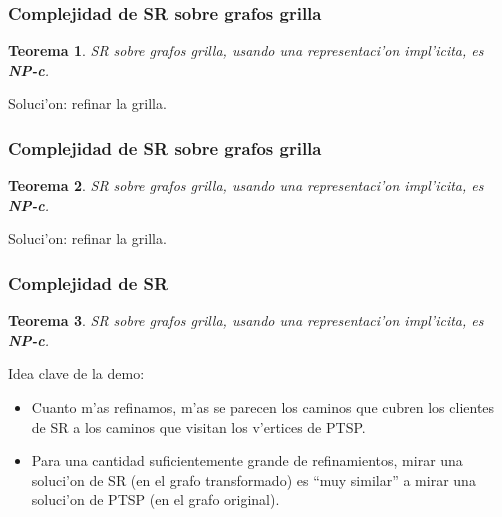 \documentclass{beamer}
\newcommand{\class}[1]{\textnormal{\textbf{#1}}}
\newcommand{\probl}[1]{\textnormal{\textsf{#1}}}
\newtheorem*{thm}{Teorema}
\begin{document}
\begin{frame}
\frametitle{Complejidad de \probl{SR} sobre grafos grilla}

\begin{thm}
\probl{SR} sobre grafos grilla, usando una representaci'on impl'icita, es \class{NP-c}.
\end{thm}

Soluci'on: refinar la grilla.

\vspace{3mm}

\begin{figure}
	\begin{center}
		
	\end{center}	
\end{figure}

\end{frame}

\begin{frame}
\frametitle{Complejidad de \probl{SR} sobre grafos grilla}

\begin{thm}
\probl{SR} sobre grafos grilla, usando una representaci'on impl'icita, es \class{NP-c}.
\end{thm}

Soluci'on: refinar la grilla.

\vspace{3mm}

\begin{figure}
	\begin{center}
		
	\end{center}	
\end{figure}

\end{frame}

\begin{frame}
\frametitle{Complejidad de \probl{SR}}

\begin{thm}
\probl{SR} sobre grafos grilla, usando una representaci'on impl'icita, es \class{NP-c}.
\end{thm}

\pause

\vspace{3mm}

Idea clave de la demo:
\pause
\begin{itemize}
	\item Cuanto m'as refinamos, m'as se parecen los caminos que cubren los clientes de \probl{SR} a los caminos que visitan los v'ertices de \probl{PTSP}. 
	\pause
	\item Para una cantidad suficientemente grande de refinamientos, mirar una soluci'on de \probl{SR} (en el grafo transformado) es ``muy similar'' a mirar una soluci'on de \probl{PTSP} (en el grafo original).
\end{itemize}

\end{frame}
\end{document}
